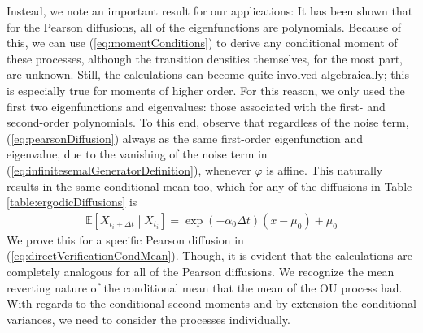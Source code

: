 Instead, we note an important result for our applications: It has been shown \cite{FormanSorensen2008} that for the Pearson diffusions, all of the eigenfunctions are polynomials. Because of this, we can use (\ref{eq:momentConditions}) to derive any conditional moment of these processes, although the transition densities themselves, for the most part, are unknown. Still, the calculations can become quite involved algebraically; this is especially true for moments of higher order. For this reason, we only used the first two eigenfunctions and eigenvalues: those associated with the first- and second-order polynomials. To this end, observe that regardless of the noise term, (\ref{eq:pearsonDiffusion}) always as the same first-order eigenfunction and eigenvalue, due to the vanishing of the noise term in (\ref{eq:infinitesemalGeneratorDefinition}), whenever $\varphi$ is affine. This naturally results in the same conditional mean too, which for any of the diffusions in Table \ref{table:ergodicDiffusions} is
\begin{align}
    \mathbb{E}\left[X_{t_{i}+\Delta t} \middle|X_{t_{i}} \right] = \exp\left(-\alpha_0\Delta t\right)\left(x-\mu_0\right) + \mu_0
\end{align}
We prove this for a specific Pearson diffusion in (\ref{eq:directVerificationCondMean}). Though, it is evident that the calculations are completely analogous for all of the Pearson diffusions. We recognize the mean reverting nature of the conditional mean that the mean of the OU process had. With regards to the conditional second moments and by extension the conditional variances, we need to consider the processes individually.
